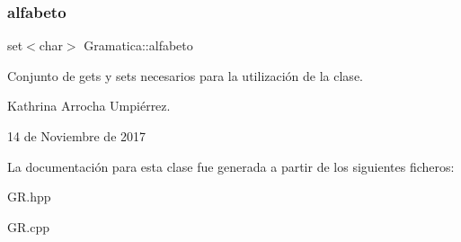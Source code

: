 \subsubsection{\texorpdfstring{alfabeto}{alfabeto}}
{\footnotesize\ttfamily set$<$char$>$ Gramatica\+::alfabeto}

Conjunto de gets y sets necesarios para la utilización de la clase.

Kathrina Arrocha Umpiérrez.

14 de Noviembre de 2017 

La documentación para esta clase fue generada a partir de los siguientes ficheros\+:\begin{DoxyCompactItemize}
\item 
G\+R.\+hpp\item 
G\+R.\+cpp\end{DoxyCompactItemize}
